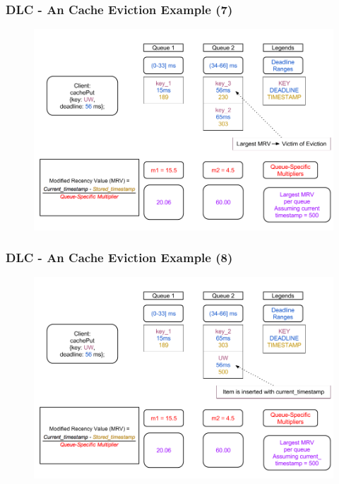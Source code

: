 \documentclass{beamer}
\begin{document}
\begin{frame}
  \frametitle{DLC - An Cache Eviction Example (7)}
  \begin{figure}
    \begin{center}
      \centerline{\includegraphics[scale=0.33]{img/DLC_V5_7.png}}
    \end{center}
  \end{figure}
\end{frame}

\begin{frame}
  \frametitle{DLC - An Cache Eviction Example (8)}
  \begin{figure}
    \begin{center}
      \centerline{\includegraphics[scale=0.33]{img/DLC_V5_8.png}}
    \end{center}
  \end{figure}
\end{frame}
\end{document}
